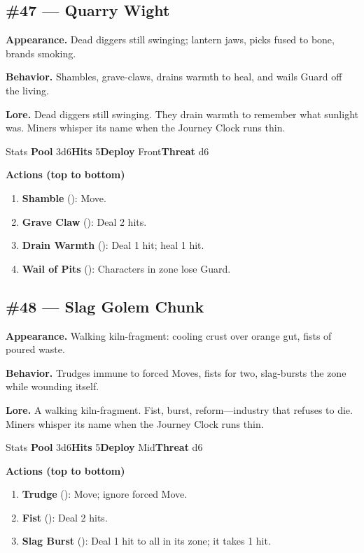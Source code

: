 \subsection*{\#47 --- Quarry Wight}

\textbf{Appearance.} Dead diggers still swinging; lantern jaws, picks fused to bone, brands smoking.

\textbf{Behavior.} Shambles, grave-claws, drains warmth to heal, and wails Guard off the living.

\textbf{Lore.} Dead diggers still swinging. They drain warmth to remember what sunlight was. Miners whisper its name when the Journey Clock runs thin.

\begin{monsterentry}{Stats}
\textbf{Pool} 3d6\quad\textbf{Hits} 5\quad\textbf{Deploy} Front\quad\textbf{Threat} d6

\textbf{Actions (top to bottom)}
\begin{enumerate}\setlength{\itemsep}{0.15em}\setlength{\parskip}{0pt}
  \item \textbf{Shamble} (\easy): Move.
  \item \textbf{Grave Claw} (\medium): Deal 2 hits.
  \item \textbf{Drain Warmth} (\hard): Deal 1 hit; heal 1 hit.
  \item \textbf{Wail of Pits} (\medium): Characters in zone lose Guard.
\end{enumerate}
\end{monsterentry}

\subsection*{\#48 --- Slag Golem Chunk}

\textbf{Appearance.} Walking kiln-fragment: cooling crust over orange gut, fists of poured waste.

\textbf{Behavior.} Trudges immune to forced Moves, fists for two, slag-bursts the zone while wounding itself.

\textbf{Lore.} A walking kiln-fragment. Fist, burst, reform---industry that refuses to die. Miners whisper its name when the Journey Clock runs thin.

\begin{monsterentry}{Stats}
\textbf{Pool} 3d6\quad\textbf{Hits} 5\quad\textbf{Deploy} Mid\quad\textbf{Threat} d6

\textbf{Actions (top to bottom)}
\begin{enumerate}\setlength{\itemsep}{0.15em}\setlength{\parskip}{0pt}
  \item \textbf{Trudge} (\easy): Move; ignore forced Move.
  \item \textbf{Fist} (\medium): Deal 2 hits.
  \item \textbf{Slag Burst} (\hard): Deal 1 hit to all in its zone; it takes 1 hit.
\end{enumerate}
\end{monsterentry}

